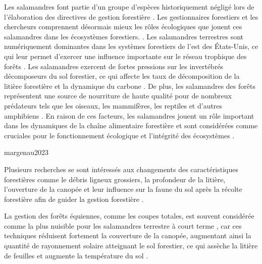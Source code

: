 Les salamandres font partie d'un groupe d'espèces historiquement négligé lors de l'élaboration des directives de gestion forestière \citep{deMaynadier1995relationshipforest}.
Les gestionnaires forestiers et les chercheurs comprennent désormais mieux les rôles écologiques que jouent ces salamandres dans les écosystèmes forestiers. \citep{Homyack2010Doesplethodon,Hocking2014Effectsredbacked}. 
Les salamandres terrestres sont numériquement dominantes dans les systèmes forestiers de l'est des États-Unis, ce qui leur permet d'exercer une influence importante sur le réseau trophique des forêts \citep{Burton1975Salamanderpopulations,Hairston1987evolutioncompeting}.
Les salamandres exercent de fortes pressions sur les invertébrés décomposeurs du sol forestier, ce qui affecte les taux de décomposition de la litière forestière et la dynamique du carbone \citep{Wyman1998Experimentalassessment,Walton2013Topdownregulation,Hickerson2017Easternredbacked}.
De plus, les salamandres des forêts représentent une source de nourriture de haute qualité pour de nombreux prédateurs tels que les oiseaux, les mammifères, les reptiles et d'autres amphibiens \citep{Burton1975Energyflow,Petranka1998SalamandersUnited}.
En raison de ces facteurs, les salamandres jouent un rôle important dans les dynamiques de la chaîne alimentaire forestière et sont considérées comme cruciales pour le fonctionnement écologique et l'intégrité des écosystèmes \citep{Welsh2001caseusing,Davic2004ecologicalroles}. 



margenau2023

Plusieurs recherches se sont intéressés aux changements des caractéristiques forestières comme le débris ligneux grossiers, la profondeur de la litière, l'ouverture de la canopée 
et leur influence sur la faune du sol après la récolte forestière afin de guider la gestion forestière \citep{Semlitsch2002CriticalElements,McKenny2006Effectsstructural}. 

La gestion des forêts équiennes, comme les coupes totales, est souvent considérée comme la plus nuisible pour les salamandres terrestre à court terme \citep{Duguay2002SalamanderAbundance,Hocking2013Effectsexperimental}, 
car ces techniques réduisent fortement la couverture de la canopée, augmentant ainsi la quantité de rayonnement solaire atteignant le sol forestier, 
ce qui assèche la litière de feuilles et augmente la température du sol \citep{Brooks2008Forestfloor}. 

